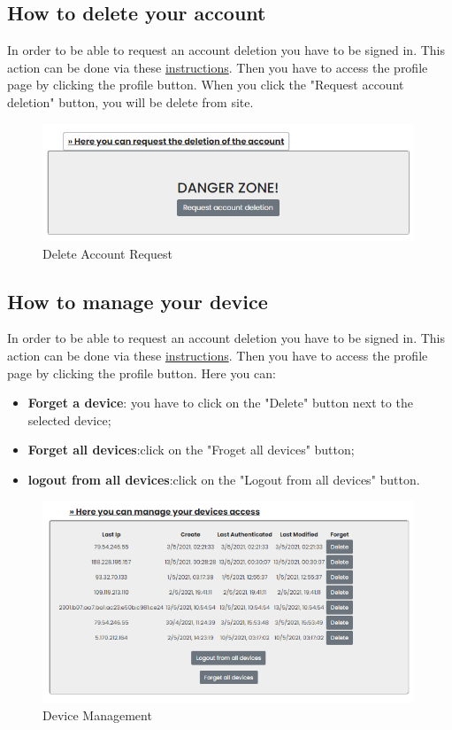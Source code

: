 \subsection{How to delete your account} \label{_delete}
In order to be able to request an account deletion you have to be signed in. This action can be done via these \hyperref[_signin]{instructions}.
Then you have to access the profile page by clicking the profile button.
When you click the "Request account deletion" button, you will be delete from site.
\begin{figure}[H]
    \centering
    \includegraphics[width=30em]{res/images/cliente/delete.png}
    \caption{Delete Account Request}
\end{figure}

\subsection{How to manage your device} \label{_device}
In order to be able to request an account deletion you have to be signed in. This action can be done via these \hyperref[_signin]{instructions}.
Then you have to access the profile page by clicking the profile button.
Here you can:
\begin{itemize} 
    \item \textbf{Forget a device}: you have to click on the "Delete" button next to the selected device; 
    \item \textbf{Forget all devices}:click on the "Froget all devices" button;
    \item \textbf{logout from all devices}:click on the "Logout from all devices" button.
\end{itemize}

\begin{figure}[H]
    \centering
    \includegraphics[width=30em]{res/images/cliente/device.png}
    \caption{Device Management}
\end{figure}

